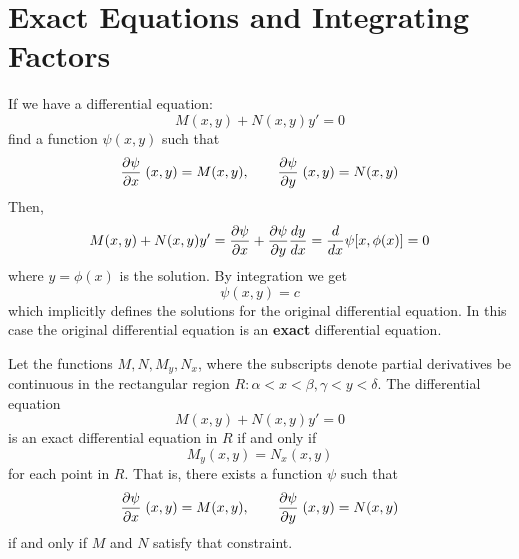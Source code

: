 \section{Exact Equations and Integrating Factors}
    If we have a differential equation:
    \begin{equation*}
        M(x, y) + N(x, y)y' = 0
    \end{equation*}
    find a function $\psi(x, y)$ such that
    \begin{equation*}
        \pdv{\psi}{x}\;(x, y) = M(x, y), \qquad \pdv{\psi}{y}\;(x, y) = N(x, y)
    \end{equation*}
    Then,
    \begin{equation*}
        M(x, y) + N(x, y)y' = \pdv{\psi}{x} (x, y) + \pdv{\psi}{y} (x, y) \frac{dy}{dx} = \frac{d}{dx}\psi[x, \phi(x)] = 0
    \end{equation*}
    where $y = \phi(x)$ is the solution. By integration we get
    \begin{equation*}
        \psi(x, y) = c
    \end{equation*}
    which implicitly defines the solutions for the original differential equation. In this case the original differential equation is an \textbf{exact} differential equation.
    \begin{theorem}
        Let the functions $M, N, M_y, N_x$, where the subscripts denote partial derivatives be continuous in the rectangular region $R: \alpha < x < \beta, \gamma < y < \delta$. The differential equation
        \begin{equation*}
            M(x, y) + N(x, y)y' = 0
        \end{equation*}
        is an exact differential equation in $R$ if and only if
        \begin{equation*}
            M_y(x, y) = N_x(x, y)
        \end{equation*}
        for each point in $R$. That is, there exists a function $\psi$ such that
        \begin{equation*}
            \pdv{\psi}{x}\;(x, y) = M(x, y), \qquad \pdv{\psi}{y}\;(x, y) = N(x, y)
        \end{equation*}
        if and only if $M$ and $N$ satisfy that constraint.
    \end{theorem}
